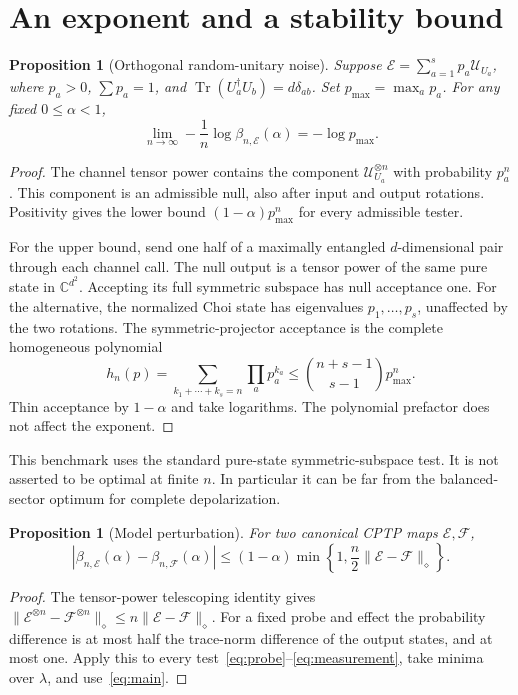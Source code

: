 \documentclass[11pt,a4paper]{article}
\newtheorem{proposition}[theorem]{Proposition}
\theoremstyle{remark}\newtheorem{remark}[theorem]{Remark}
\DeclareMathOperator{\Tr}{Tr}
\newcommand{\cE}{\mathcal E}
\newcommand{\cF}{\mathcal F}
\newcommand{\cU}{\mathcal U}
\newcommand{\bbC}{\mathbb C}
\begin{document}
\section{An exponent and a stability bound}
\begin{proposition}[Orthogonal random-unitary noise]\label{prop:exponent}
Suppose $\cE=\sum_{a=1}^s p_a\cU_{U_a}$, where $p_a>0$, $\sum p_a=1$, and $\Tr(U_a^\dagger U_b)=d\delta_{ab}$. Set $p_{\max}=\max_a p_a$. For any fixed $0\leq\alpha<1$,
\begin{equation}
 \lim_{n\to\infty}-\frac1n\log\beta_{n,\cE}(\alpha)=-\log p_{\max}.
\end{equation}
\end{proposition}
\begin{proof}
The channel tensor power contains the component $\cU_{U_a}^{\otimes n}$ with probability $p_a^n$. This component is an admissible null, also after input and output rotations. Positivity gives the lower bound $(1-\alpha)p_{\max}^n$ for every admissible tester.

For the upper bound, send one half of a maximally entangled $d$-dimensional pair through each channel call. The null output is a tensor power of the same pure state in $\bbC^{d^2}$. Accepting its full symmetric subspace has null acceptance one. For the alternative, the normalized Choi state has eigenvalues $p_1,\ldots,p_s$, unaffected by the two rotations. The symmetric-projector acceptance is the complete homogeneous polynomial
\begin{equation}
 h_n(p)=\sum_{k_1+\cdots+k_s=n}\prod_a p_a^{k_a}
 \leq\binom{n+s-1}{s-1}p_{\max}^n.
\end{equation}
Thin acceptance by $1-\alpha$ and take logarithms. The polynomial prefactor does not affect the exponent.
\end{proof}
This benchmark uses the standard pure-state symmetric-subspace test. It is not asserted to be optimal at finite $n$. In particular it can be far from the balanced-sector optimum for complete depolarization.

\begin{proposition}[Model perturbation]\label{prop:stable}
For two canonical CPTP maps $\cE,\cF$,
\begin{equation}
 \left|\beta_{n,\cE}(\alpha)-\beta_{n,\cF}(\alpha)\right|
 \leq (1-\alpha)\min\!\left\{1,\frac n2\lVert\cE-\cF\rVert_\diamond\right\}.
\end{equation}
\end{proposition}
\begin{proof}
The tensor-power telescoping identity gives
\(\lVert\cE^{\otimes n}-\cF^{\otimes n}\rVert_\diamond
\leq n\lVert\cE-\cF\rVert_\diamond\).
For a fixed probe and effect the probability difference is at most half the trace-norm difference of the output states, and at most one. Apply this to every test~\eqref{eq:probe}--\eqref{eq:measurement}, take minima over $\lambda$, and use~\eqref{eq:main}.
\end{proof}
\end{document}
